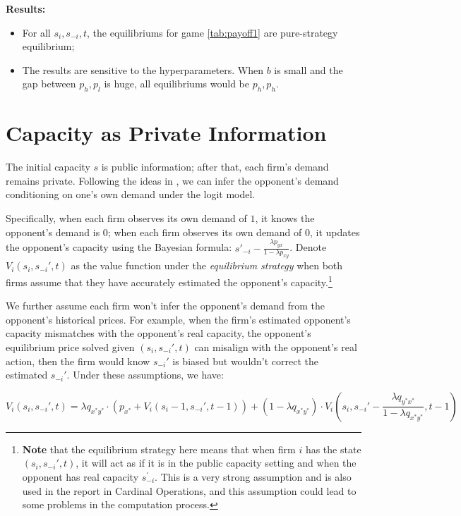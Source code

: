 \documentclass[12pt,letterpaper]{article}
\begin{document}
\textbf{Results:}

\begin{itemize}
    \item For all $s_i,s_{-i},t$, the equilibriums for game \ref{tab:payoff1} are pure-strategy equilibrium;
    \item The results are sensitive to the hyperparameters. When $b$ is small and the gap between $p_h,p_l$ is huge, all equilibriums would be $p_h, p_h$.
\end{itemize}

\section{Capacity as Private Information}

The initial capacity $s$ is public information; after that, each firm's demand remains private. Following the ideas in \cite{loots2023data}, we can infer the opponent's demand conditioning on one's own demand under the logit model. 

Specifically, when each firm observes its own demand of $1$, it knows the opponent's demand is $0$; when each firm observes its own demand of $0$, it updates the opponent's capacity using the Bayesian formula: $s'_{-i}-\frac{\lambda p_{yx}}{1-\lambda p_{xy}}$. Denote $V_i(s_i,s_{-i}',t)$ as the value function under the \textit{equilibrium strategy} when both firms assume that they have accurately estimated the opponent's capacity.\footnote{\textbf{Note} that the equilibrium strategy here means that when firm $i$ has the state $(s_i,s_{-i}',t)$, it will act as if it is in the public capacity setting and when the opponent has real capacity $s_{-i}^'$. This is a very strong assumption and is also used in the report in Cardinal Operations, and this assumption could lead to some problems in the computation process.}

We further assume each firm won't infer the opponent's demand from the opponent's historical prices. For example, when the firm's estimated opponent's capacity mismatches with the opponent's real capacity, the opponent's equilibrium price solved given $(s_i,s_{-i}',t)$ can misalign with the opponent's real action, then the firm would know $s_{-i}'$ is biased but wouldn't correct the estimated $s_{-i}'$. Under these assumptions, we have:

\[
    V_i(s_i,s_{-i}', t) = \lambda q_{x^*y^*}\cdot(p_{x^*}+V_i(s_i-1,s_{-i}',t-1)) + (1-\lambda q_{x^*y^*})\cdot V_i(s_i, s_{-i}'-\frac{\lambda q_{y^*x^*}}{1-\lambda q_{x^*y^*}}, t-1)
\]
\end{document}

